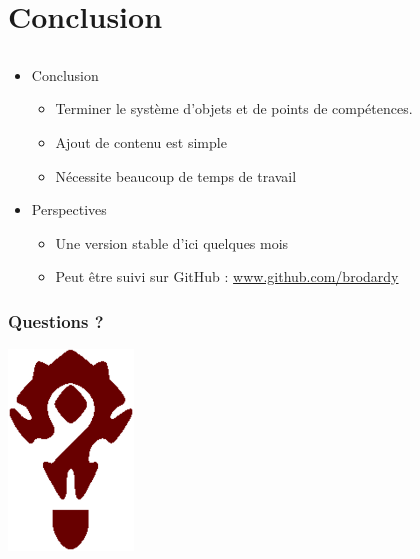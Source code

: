 \documentclass{beamer}
\begin{document}
\section{Conclusion}
\subsection{}
\begin{frame}
\begin{itemize}
\item Conclusion
\begin{itemize}
	\item Terminer le système d'objets et de points de compétences.
	\item Ajout de contenu est simple
	\item Nécessite beaucoup de temps de travail
\end{itemize}
\item Perspectives
\begin{itemize}
	\item Une version stable d'ici quelques mois
	\item Peut être suivi sur GitHub : \url{www.github.com/brodardy}
\end{itemize}
\end{itemize}
\end{frame}

\begin{frame}
\frametitle{Questions ?}
\begin{center}
\includegraphics[width=0.25\textwidth]{img/question.png}
\end{center}
\end{frame}
\end{document}
